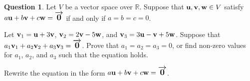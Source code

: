 \documentclass{article}
\newcommand{\R}{\mathbb{R}}
\renewcommand{\u}{{\bf u}}
\renewcommand{\v}{{\bf v}}
\newcommand{\w}{{\bf w}}
\newcommand{\zero}{\mbox{\large $\overrightarrow{\mathbf{0}}$}}
\theoremstyle{definition}
\newtheorem{question}{Question}
\begin{document}
\vspace{.75cm}

\label{Question 2}



\begin{question} Let $V$ be a vector space over $\R$. Suppose that $\u, \v, \w \in V$ satisfy $a\u + b\v + c\w = \zero$ if and only if $a = b = c = 0$.

\vspace{.25cm}

\noindent Let $\v_1 = \u+3\v$, $\v_2 = 2\v - 5\w$, and $\v_3 = 3\u - \v + 5\w$. Suppose that $a_1\v_1 + a_2\v_2 + a_3\v_3 = \zero$. Prove that $a_1 = a_2 = a_3 = 0$, or find non-zero values for $a_1$, $a_2$, and $a_3$ such that the equation holds.

\vspace{.25cm}

 Rewrite the equation in the form $a\u + b\v + c\w = \zero$.

\end{question}
\end{document}
